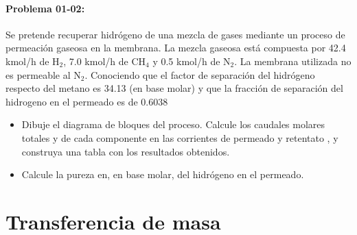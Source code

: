 \documentclass{report}
\begin{document}
\subsubsection{\textbf{Problema 01-02:}} 
\begin{raggedright}
	Se pretende recuperar hidrógeno de una mezcla de gases mediante un proceso de permeación gaseosa en la membrana. La mezcla gaseosa está compuesta por 42.4 kmol/h de H$_2$, 7.0 kmol/h de CH$_4$ y 0.5 kmol/h de N$_2$. 
	La membrana utilizada no es permeable al N$_2$. Conociendo que el factor de separación del hidrógeno respecto del metano es 34.13 (en base molar) y que la fracción de separación del hidrogeno en el permeado es de 0.6038 
	\begin{itemize}
		\item Dibuje el diagrama de bloques del proceso. Calcule los caudales molares totales y de cada componente en las corrientes de permeado y retentato , y construya una tabla con los resultados obtenidos.
		\item Calcule la pureza en, en base molar, del hidrógeno en el permeado.
	\end{itemize}
\end{raggedright}
\chapter{Transferencia de masa}
\end{document}
